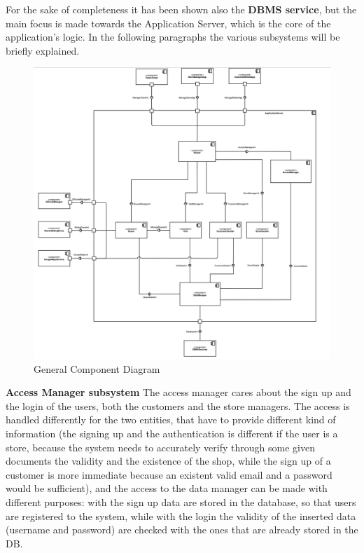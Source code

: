 \documentclass[]{article}
\begin{document}
	\textbf{} \newline
For the sake of completeness it has been shown also the \textbf{DBMS service}, but the main focus is made towards the Application Server, which is the core of the application’s logic. \newline\newline
In the following paragraphs the various subsystems will be briefly explained.\\

	\begin{figure}[H]
			\centering
			\includegraphics[scale=0.9]{ComponentView/ComponentViewDiagram.png}
			\caption{General Component Diagram}
			\label{fig:ComponentDiagram}
		\end{figure}
		\bigskip\bigskip
	\newpage
	\noindent
	\textbf{Access Manager subsystem} \newline
	The access manager cares about the sign up and the login of the users, both the customers and the store managers. The access is handled differently for the two entities, that have to provide different kind of information (the signing up and the authentication is different if the user is a store, because the system needs to accurately verify through some given documents the validity and the existence of the shop, while the sign up of a customer is more immediate because an existent valid email and a password would be sufficient), and the access to the data manager can be made with different purposes: with the sign up data are stored in the database, so that users are registered to the system, while with the login the validity of the inserted data (username and password) are checked with the ones that are already stored in the DB. 
\end{document}
